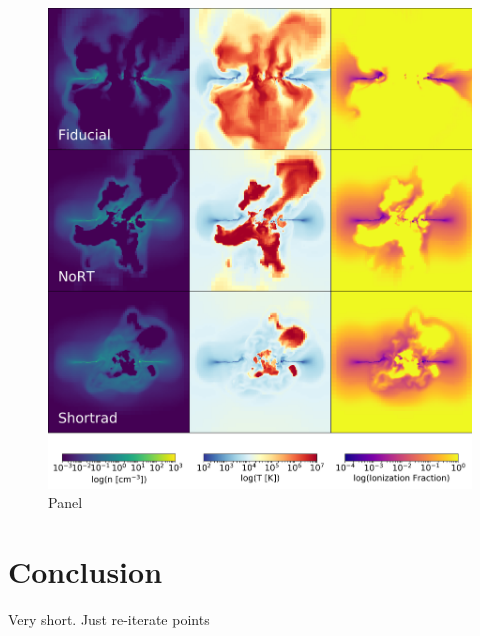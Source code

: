 \documentclass[twocolumn]{aastex62}
\begin{document}
\begin{figure}
\centering
\includegraphics[width=0.99\linewidth]{DD0160_fiducial_shortrad_nort}
\caption{Panel}
\label{fig:pane2}
\end{figure}

\section{Conclusion}  \label{sec:conclusion}
Very short. Just re-iterate points

\begin{thebibliography}{}


\end{thebibliography}


\end{document}
